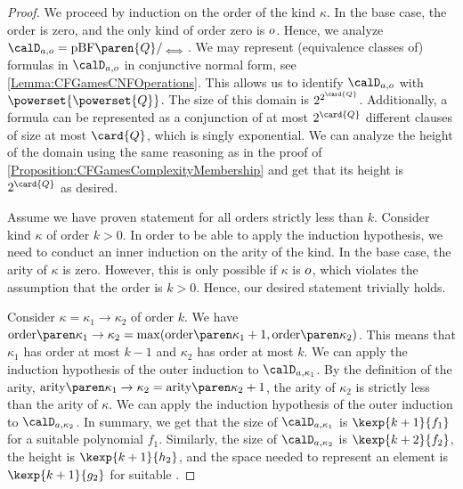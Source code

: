 \documentclass[../../diss.tex]{subfiles}
\begin{document}
\begin{proof}
    We proceed by induction on the order of the kind $\kappa$.
    In the base case, the order is zero, and the only kind of order zero is $o$.
    Hence, we analyze $\domaina{\ground} = \pBF\paren{Q}/_{\lequiv}$.
    We may represent (equivalence classes of) formulas in $\domaina{\ground}$ in conjunctive normal form, see \cref{Lemma:CFGamesCNFOperations}.
    This allows us to identify $\domaina{\ground}$ with $\powerset{\powerset{Q}}$.
    The size of this domain is $2^{2^{\card{Q}}}$.
    Additionally, a formula can be represented as a conjunction of at most $2^{\card{Q}}$ different clauses of size at most $\card{Q}$, which is singly exponential.
    We can analyze the height of the domain using the same reasoning as in the proof of \cref{Proposition:CFGamesComplexityMembership} and get that its height is $2^{\card{Q}}$ as desired.

    Assume we have proven statement for all orders strictly less than $k$.
    Consider kind $\kappa$ of order $k > 0$.
    In order to be able to apply the induction hypothesis, we need to conduct an inner induction on the arity of the kind.
    In the base case, the arity of $\kappa$ is zero.
    However, this is only possible if $\kappa$ is $o$, which violates the assumption that the order is $k > 0$.
    Hence, our desired statement trivially holds.

    Consider $\kappa = \kappa_1 \to \kappa_2$ of order $k$.
    We have $\horsorder{\kappa_1 \to \kappa_2} = \max(\horsorder{\kappa_1} +1, \horsorder{\kappa_2})$.
    This means that $\kappa_1$ has order at most $k-1$ and $\kappa_2$ has order at most $k$.
    We can apply the induction hypothesis of the outer induction to $\domaina{\kappa_1}$.
    By the definition of the arity, $\horsarity{\kappa_1 \to \kappa_2} = \horsarity{\kappa_2}+1$, the arity of $\kappa_2$ is strictly less than the arity of $\kappa$.
    We can apply the induction hypothesis of the outer induction to $\domaina{\kappa_2}$.
    In summary, we get that the size of $\domaina{\kappa_1}$ is $\kexp{k+1}{f_1}$ for a suitable polynomial $f_1$.
    Similarly, the size of $\domaina{\kappa_2}$ is $\kexp{k+2}{f_2}$, the height is $\kexp{k+1}{h_2}$, and the space needed to represent an element is $\kexp{k+1}{g_2}$ for suitable .


\end{proof}
\end{document}
